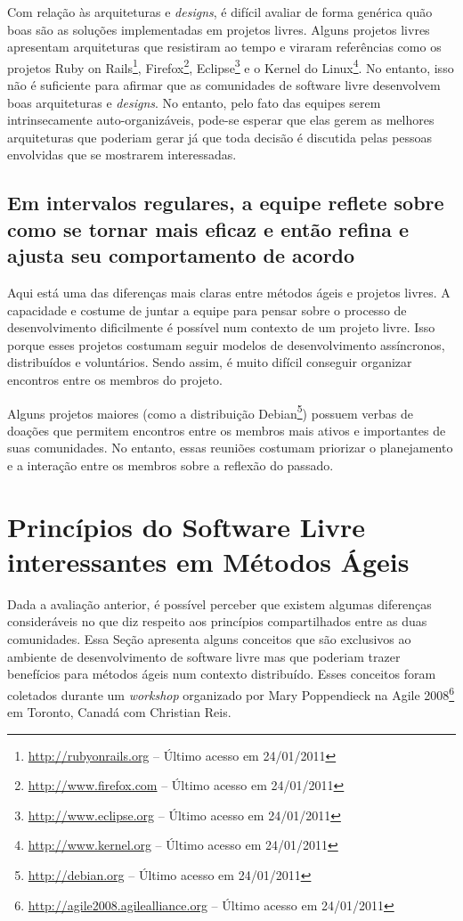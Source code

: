 Com relação às arquiteturas e \textit{designs}, é difícil avaliar de
forma genérica quão boas são as soluções implementadas em projetos
livres. Alguns projetos livres apresentam arquiteturas que resistiram
ao tempo e viraram referências como os projetos Ruby on
Rails\footnote{\url{http://rubyonrails.org} -- Último acesso em
  24/01/2011}, Firefox\footnote{\url{http://www.firefox.com} -- Último
  acesso em 24/01/2011}, Eclipse\footnote{\url{http://www.eclipse.org}
  -- Último acesso em 24/01/2011} e o Kernel do
Linux\footnote{\url{http://www.kernel.org} -- Último acesso em
  24/01/2011}. No entanto, isso não é suficiente para afirmar que as
comunidades de software livre desenvolvem boas arquiteturas e
\textit{designs}. No entanto, pelo fato das equipes serem
intrinsecamente auto-organizáveis, pode-se esperar que elas gerem as
melhores arquiteturas que poderiam gerar já que toda decisão é
discutida pelas pessoas envolvidas que se mostrarem interessadas.

\subsection[Refletir regularmente]{Em intervalos regulares, a equipe
  reflete sobre como se tornar mais eficaz e então refina e ajusta seu
  comportamento de acordo}

Aqui está uma das diferenças mais claras entre métodos ágeis e
projetos livres. A capacidade e costume de juntar a equipe para pensar
sobre o processo de desenvolvimento dificilmente é possível num
contexto de um projeto livre. Isso porque esses projetos costumam
seguir modelos de desenvolvimento assíncronos, distribuídos e
voluntários. Sendo assim, é muito difícil conseguir organizar
encontros entre os membros do projeto.

Alguns projetos maiores (como a distribuição
Debian\footnote{\url{http://debian.org} -- Último acesso em
  24/01/2011}) possuem verbas de doações que permitem encontros entre
os membros mais ativos e importantes de suas comunidades. No entanto,
essas reuniões costumam priorizar o planejamento e a interação entre
os membros sobre a reflexão do passado.

\section{Princípios do Software Livre interessantes em Métodos Ágeis}
\label{sec:foss-over-agile}

Dada a avaliação anterior, é possível perceber que existem algumas
diferenças consideráveis no que diz respeito aos princípios
compartilhados entre as duas comunidades. Essa Seção apresenta alguns
conceitos que são exclusivos ao ambiente de desenvolvimento de
software livre mas que poderiam trazer benefícios para métodos ágeis
num contexto distribuído. Esses conceitos foram coletados durante um
\emph{workshop} organizado por Mary Poppendieck na Agile
2008\footnote{\url{http://agile2008.agilealliance.org} -- Último
  acesso em 24/01/2011} em Toronto, Canadá com Christian Reis.

